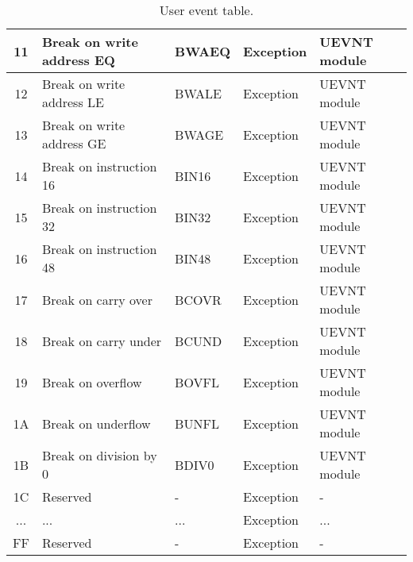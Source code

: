 \begin{table}[hbt!]
\begin{center}
\begin{tabular}{|c|l|l|l|l|}
        \hline
        11 & Break on write address EQ & BWAEQ & Exception & UEVNT module \\
        \hline
        12 & Break on write address LE & BWALE & Exception & UEVNT module \\
        \hline
        13 & Break on write address GE & BWAGE & Exception & UEVNT module \\
        \hline
        14 & Break on instruction 16 & BIN16 & Exception & UEVNT module \\
        \hline
        15 & Break on instruction 32 & BIN32 & Exception & UEVNT module \\
        \hline
        16 & Break on instruction 48 & BIN48 & Exception & UEVNT module \\
        \hline
        17 & Break on carry over & BCOVR & Exception & UEVNT module \\
        \hline
        18 & Break on carry under & BCUND & Exception & UEVNT module \\
        \hline
        19 & Break on overflow & BOVFL & Exception & UEVNT module \\
        \hline
        1A & Break on underflow & BUNFL & Exception & UEVNT module \\
        \hline
        1B & Break on division by 0 & BDIV0 & Exception & UEVNT module \\
        \hline
        1C & Reserved & - & Exception & - \\
        \hline
        ... & ... & ... & Exception & ... \\
        \hline
        FF & Reserved & - & Exception & - \\
        \hline

    \end{tabular}

    \caption[User event table]{User event table.}

    \end{center}

\end{table}